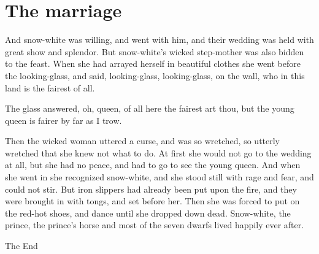 \documentclass[a4paper,11pt]{article}
\begin{document}
\section{The marriage}

And snow-white was willing, and went with him, and their wedding
was held with great show and splendor.  But snow-white's
wicked step-mother was also bidden to the feast.  When she had
arrayed herself in beautiful clothes she went before the
looking-glass, and said,
          looking-glass, looking-glass, on the wall,
          who in this land is the fairest of all.

The glass answered,
          oh, queen, of all here the fairest art thou,
          but the young queen is fairer by far as I trow.

Then the wicked woman uttered a curse, and was so wretched,
so utterly wretched that she knew not what to do.  At first she
would not go to the wedding at all, but she had no peace, and
had to go to see the young queen.  And when she went in she
recognized snow-white, and she stood still with rage and fear,
and could not stir.  But iron slippers had already been put upon
the fire, and they were brought in with tongs, and set before
her.  Then she was forced to put on the red-hot shoes, and dance
until she dropped down dead. Snow-white, the prince, the prince's
horse and most of the seven dwarfs lived happily ever after.

\begin{center}
                         \Huge The End
\end{center}
\end{document}
